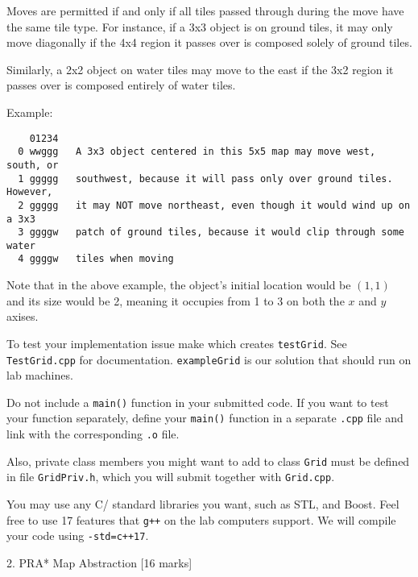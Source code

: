 \documentclass[a4paper,11pt]{article}
\begin{document}
\bigskip

Moves are permitted if and only if all tiles passed through during the move
have the same tile type. For instance, if a 3x3 object is on ground tiles, it
may only move diagonally if the 4x4 region it passes over is composed solely
of ground tiles.

Similarly, a 2x2 object on water tiles may move to the east if the 3x2 region
it passes over is composed entirely of water tiles.

\bigskip 

Example:
\begin{verbatim}
    01234
  0 wwggg   A 3x3 object centered in this 5x5 map may move west, south, or
  1 ggggg   southwest, because it will pass only over ground tiles. However,
  2 ggggg   it may NOT move northeast, even though it would wind up on a 3x3
  3 ggggw   patch of ground tiles, because it would clip through some water
  4 ggggw   tiles when moving
\end{verbatim}

Note that in the above example, the object's initial location would be $(1,1)$
and its size would be 2, meaning it occupies from 1 to 3 on both the $x$ and $y$
axises.

\bigskip

To test your implementation issue make which creates \texttt{testGrid}. See
\texttt{TestGrid.cpp} for documentation.
\texttt{exampleGrid} is our solution that should run on lab machines.

\bigskip

Do not include a \texttt{main()} function in your submitted code. 
If you want to test your function separately, define
your \texttt{main()} function in a separate \texttt{.cpp} file and link with the corresponding
\texttt{.o} file.

\bigskip 

Also, private class members you might want to add to class \texttt{Grid} must be
defined in file \texttt{GridPriv.h}, which you will submit together with \texttt{Grid.cpp}.

\bigskip 

You may use any C/{\CC} standard libraries you
want, such as STL, and Boost. Feel free to use {\CC}17 features that \texttt{g++} on the
lab computers support. We will compile your code using \texttt{-std=c++17}.

\linerule

\bigskip

2. PRA* Map Abstraction [16 marks] 
\end{document}
